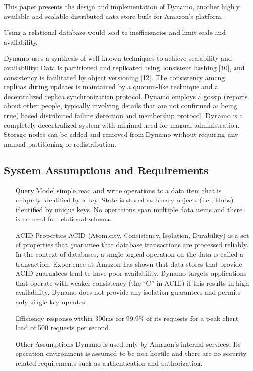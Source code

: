 
This paper presents the design and implementation of Dynamo, another highly available and scalable distributed data store built for Amazon’s platform. 

Using a relational database would lead to inefficiencies and limit scale and availability.

Dynamo uses a synthesis of well known techniques to achieve
scalability and availability: Data is partitioned and replicated
using consistent hashing [10], and consistency is facilitated by
object versioning [12]. The consistency among replicas during
updates is maintained by a quorum-like technique and a
decentralized replica synchronization protocol. 
Dynamo employs a gossip (reports about other people, typically involving details that are not confirmed as being true) based distributed failure detection and membership protocol. Dynamo is a completely decentralized system with
minimal need for manual administration. Storage nodes can be
added and removed from Dynamo without requiring any manual
partitioning or redistribution. 

\subsection{System Assumptions and Requirements}

\begin{itemize}
\item[Query Model] simple read and write operations to a data item that
is uniquely identified by a key. State is stored as binary objects
(i.e., blobs) identified by unique keys. No operations span
multiple data items and there is no need for relational schema. 

\item[ACID Properties] ACID (Atomicity, Consistency, Isolation,
Durability) is a set of properties that guarantee that database
transactions are processed reliably. In the context of databases, a
single logical operation on the data is called a transaction.
Experience at Amazon has shown that data stores that provide
ACID guarantees tend to have poor availability. Dynamo targets applications that operate with weaker consistency
(the “C” in ACID) if this results in high availability. Dynamo
does not provide any isolation guarantees and permits only single
key updates. 

\item[Efficiency] response within 300ms for 99.9\% of its requests for a
peak client load of 500 requests per second.

\item[Other Assumptions] Dynamo is used only by Amazon’s internal
services. Its operation environment is assumed to be non-hostile
and there are no security related requirements such as
authentication and authorization.
\end{itemize}

